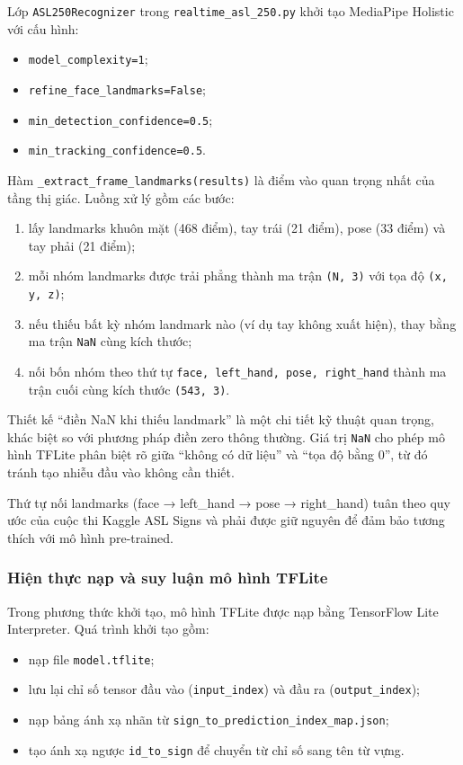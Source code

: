 Lớp \texttt{ASL250Recognizer} trong \texttt{realtime\_asl\_250.py} khởi tạo MediaPipe Holistic với
cấu hình:
\begin{itemize}
    \item \texttt{model\_complexity=1};
    \item \texttt{refine\_face\_landmarks=False};
    \item \texttt{min\_detection\_confidence=0.5};
    \item \texttt{min\_tracking\_confidence=0.5}.
\end{itemize}

Hàm \texttt{\_extract\_frame\_landmarks(results)} là điểm vào quan trọng nhất của tầng thị giác.
Luồng xử lý gồm các bước:
\begin{enumerate}
    \item lấy landmarks khuôn mặt (468 điểm), tay trái (21 điểm), pose (33 điểm) và tay phải
    (21 điểm);
    \item mỗi nhóm landmarks được trải phẳng thành ma trận \texttt{(N, 3)} với tọa độ
    \texttt{(x, y, z)};
    \item nếu thiếu bất kỳ nhóm landmark nào (ví dụ tay không xuất hiện), thay bằng ma trận
    \texttt{NaN} cùng kích thước;
    \item nối bốn nhóm theo thứ tự \texttt{face, left\_hand, pose, right\_hand} thành ma trận
    cuối cùng kích thước \texttt{(543, 3)}.
\end{enumerate}

Thiết kế ``điền NaN khi thiếu landmark'' là một chi tiết kỹ thuật quan trọng, khác biệt so với
phương pháp điền zero thông thường. Giá trị \texttt{NaN} cho phép mô hình TFLite phân biệt rõ
giữa ``không có dữ liệu'' và ``tọa độ bằng 0'', từ đó tránh tạo nhiễu đầu vào không cần thiết.

Thứ tự nối landmarks (face → left\_hand → pose → right\_hand) tuân theo quy ước của cuộc thi
Kaggle ASL Signs và phải được giữ nguyên để đảm bảo tương thích với mô hình pre-trained.

\subsubsection{Hiện thực nạp và suy luận mô hình TFLite}

Trong phương thức khởi tạo, mô hình TFLite được nạp bằng TensorFlow Lite Interpreter.
Quá trình khởi tạo gồm:
\begin{itemize}
    \item nạp file \texttt{model.tflite};
    \item lưu lại chỉ số tensor đầu vào (\texttt{input\_index}) và đầu ra
    (\texttt{output\_index});
    \item nạp bảng ánh xạ nhãn từ \texttt{sign\_to\_prediction\_index\_map.json};
    \item tạo ánh xạ ngược \texttt{id\_to\_sign} để chuyển từ chỉ số sang tên từ vựng.
\end{itemize}

